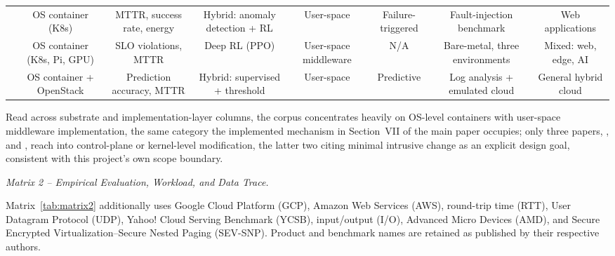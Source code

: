 \documentclass[10pt]{article}
\begin{document}
\begin{table}[t]
{\begin{tabular}{@{}lccccccc@{}}
\midrule
\cite{dsouza2026selfhealing} & OS container (K8s) & MTTR, success rate, energy & Hybrid: anomaly detection + RL & User-space & Failure-triggered & Fault-injection benchmark & Web applications \\
\cite{nigam2026chaos} & OS container (K8s, Pi, GPU) & SLO violations, MTTR & Deep RL (PPO) & User-space middleware & N/A & Bare-metal, three environments & Mixed: web, edge, AI \\
\cite{mishra2026aidriven} & OS container + OpenStack & Prediction accuracy, MTTR & Hybrid: supervised + threshold & User-space & Predictive & Log analysis + emulated cloud & General hybrid cloud \\
\bottomrule
\end{tabular}}
\end{table}

Read across substrate and implementation-layer columns, the corpus
concentrates heavily on OS-level containers with user-space
middleware implementation, the same category the implemented mechanism
in Section~VII of the main paper occupies; only three papers,
\cite{barletta2026slo}, \cite{li2026pyramid} and
\cite{jin2026replicationfree}, reach into
control-plane or kernel-level modification, the latter two citing minimal
intrusive change as an explicit design goal, consistent with this
project's own scope boundary.

\medskip\noindent\textit{Matrix 2 -- Empirical Evaluation, Workload, and Data Trace.}\par\smallskip

Matrix~\ref{tab:matrix2} additionally uses Google Cloud Platform (GCP), Amazon Web Services (AWS), round-trip time (RTT), User Datagram Protocol (UDP), Yahoo! Cloud Serving Benchmark (YCSB), input/output (I/O), Advanced Micro Devices (AMD), and Secure Encrypted Virtualization--Secure Nested Paging (SEV-SNP). Product and benchmark names are retained as published by their respective authors.
\end{document}

